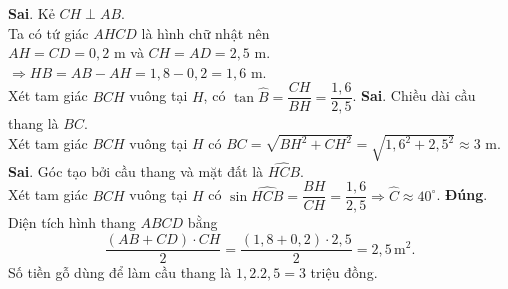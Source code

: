 \begin{ex}
{\begin{center}
	\end{center}
	\begin{itemchoice}
	\itemch \textbf{Sai}. Kẻ $CH \perp AB$.\\
	Ta có tứ giác $AHCD$ là hình chữ nhật nên\\
	$AH = CD = 0{,}2$ m và $CH = AD = 2{,}5$ m.\\
	$\Rightarrow HB = AB - AH = 1{,}8 - 0{,}2 = 1{,}6$ m.\\
	Xét tam giác $BCH$ vuông tại $H$, có $\tan \widehat{B} = \dfrac{CH}{BH} = \dfrac{1{,}6}{2{,}5}$. 
	\itemch \textbf{Sai}. Chiều dài cầu thang là $BC$.\\
	Xét tam giác $BCH$ vuông tại $H$ có $BC = \sqrt{BH^2 + CH^2} = \sqrt{1{,}6^2 + 2{,}5^2} \approx 3$ m. 
	\itemch \textbf{Sai}. Góc tạo bởi cầu thang và mặt đất là $\widehat{HCB}$.\\
	Xét tam giác $BCH$ vuông tại $H$ có $\sin \widehat{HCB}= \dfrac{BH}{CH} = \dfrac{1{,}6}{2{,}5} \Rightarrow \widehat{C} \approx 40^\circ$. 
	\itemch \textbf{Đúng}. Diện tích hình thang $ABCD$ bằng 
	$$\dfrac{(AB + CD) \cdot CH}{2} = \dfrac{(1{,}8 + 0{,}2) \cdot 2{,}5}{2} = 2{,}5\,\mathrm{m}^2.$$
	Số tiền gỗ dùng để làm cầu thang là $1{,}2 . 2{,}5 = 3$ triệu đồng.
	\end{itemchoice}
	}
\end{ex}
